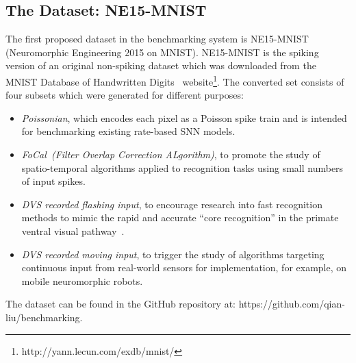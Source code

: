 \documentclass{frontiersENG} %
\begin{document}
\subsection{The Dataset: NE15-MNIST}
\label{sec:data}
The first proposed dataset in the benchmarking system is NE15-MNIST (Neuromorphic Engineering 2015 on MNIST).
NE15-MNIST is the spiking version of an original non-spiking dataset which was downloaded from the MNIST Database of Handwritten Digits~\citep{lecun1998gradient}  website\footnote{http://yann.lecun.com/exdb/mnist/}. The converted set consists of four subsets which were generated for different purposes:
\begin{itemize}
	\item \textit{Poissonian},
	which encodes each pixel as a Poisson spike train and is intended for benchmarking existing rate-based SNN models.
	\item \textit{FoCal~(Filter Overlap Correction ALgorithm)},
	to promote the study of spatio-temporal algorithms applied to recognition tasks using small numbers of input spikes.
	\item \textit{DVS recorded flashing input},
	to encourage research into fast recognition methods to mimic the rapid and accurate ``core recognition'' in the primate ventral visual pathway~\citep{dicarlo2012does}.
	\item \textit{DVS recorded moving input},
	to trigger the study of algorithms targeting continuous input from real-world sensors for implementation, for example, on mobile neuromorphic robots.
\end{itemize}
The dataset can be found in the GitHub repository at: https://github.com/qian-liu/benchmarking.
\end{document}
